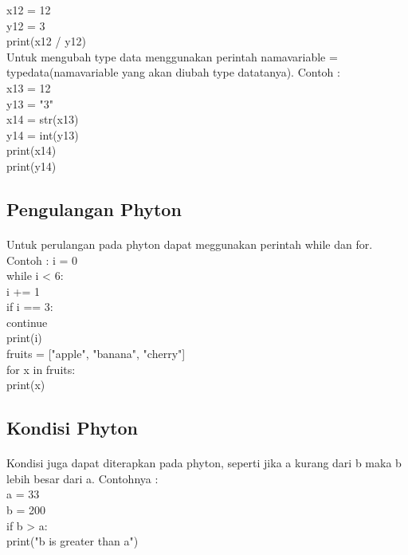 x12 = 12\\
y12 = 3\\
print(x12 / y12)\\

Untuk mengubah type data menggunakan perintah namavariable = typedata(namavariable yang akan diubah type datatanya). Contoh :\\

x13  = 12\\
y13 = "3"\\
x14 = str(x13)\\
y14 = int(y13)\\
print(x14)\\
print(y14)\\

\subsection{Pengulangan Phyton}
\paragraph{}
Untuk perulangan pada phyton dapat meggunakan perintah while dan for. Contoh :
i = 0\\
while i < 6:\\
  i += 1 \\
  if i == 3:\\
    continue\\
  print(i)\\
  
  fruits = ["apple", "banana", "cherry"]\\
for x in fruits:\\
  print(x)\\
  
 \subsection{Kondisi Phyton}
\paragraph{}
Kondisi juga dapat diterapkan pada phyton, seperti jika a kurang dari b maka b lebih besar dari a. Contohnya :\\
  a = 33\\
b = 200\\
if b > a:\\
  print("b is greater than a")\\
  
